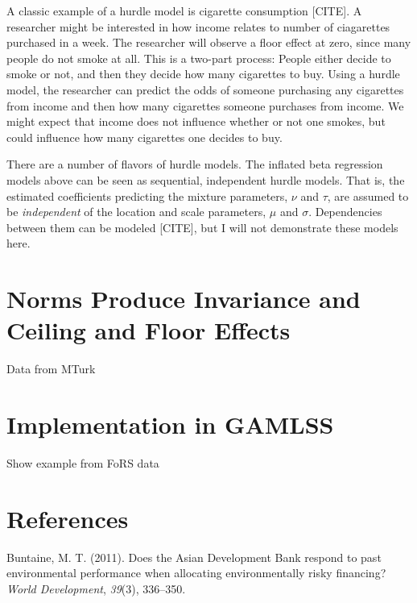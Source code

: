 \documentclass[english,man]{apa6}
\theoremstyle{definition}
\theoremstyle{definition}
\theoremstyle{remark}
\begin{document}
A classic example of a hurdle model is cigarette consumption {[}CITE{]}.
A researcher might be interested in how income relates to number of
ciagarettes purchased in a week. The researcher will observe a floor
effect at zero, since many people do not smoke at all. This is a
two-part process: People either decide to smoke or not, and then they
decide how many cigarettes to buy. Using a hurdle model, the researcher
can predict the odds of someone purchasing any cigarettes from income
and then how many cigarettes someone purchases from income. We might
expect that income does not influence whether or not one smokes, but
could influence how many cigarettes one decides to buy.

There are a number of flavors of hurdle models. The inflated beta
regression models above can be seen as sequential, independent hurdle
models. That is, the estimated coefficients predicting the mixture
parameters, \(\nu\) and \(\tau\), are assumed to be \emph{independent}
of the location and scale parameters, \(\mu\) and \(\sigma\).
Dependencies between them can be modeled {[}CITE{]}, but I will not
demonstrate these models here.

\section{Norms Produce Invariance and Ceiling and Floor
Effects}\label{norms-produce-invariance-and-ceiling-and-floor-effects}

Data from MTurk

\section{Implementation in GAMLSS}\label{implementation-in-gamlss}

Show example from FoRS data

\newpage

\section{References}\label{references}

\setlength{\parindent}{-0.5in} \setlength{\leftskip}{0.5in}

\hypertarget{refs}{}
\hypertarget{ref-buntaine2011does}{}
Buntaine, M. T. (2011). Does the Asian Development Bank respond to past
environmental performance when allocating environmentally risky
financing? \emph{World Development}, \emph{39}(3), 336--350.
\end{document}
